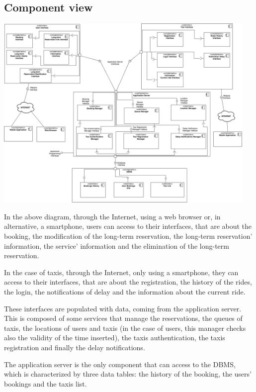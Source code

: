 \subsection{Component view}
	\begin{center}
		\includegraphics[width=0.95\textwidth]{./images/component_view.png}
	\end{center}
	
	In the above diagram, through the Internet, using a web browser or, in alternative, a smartphone, users can access to their interfaces, that are about the booking, the modification of the long-term reservation, the long-term reservation' information, the service' information and the elimination of the long-term reservation. 
	
	In the case of taxis, through the Internet, only using a smartphone, they can access to their interfaces, that are about the registration, the history of the rides, the login, the notifications of delay and the information about the current ride.
	
	These interfaces are populated with data, coming from the application server. This is composed of some services that manage the reservations, the queues of taxis, the locations of users and taxis (in the case of users, this manager checks also the validity of the time inserted), the taxis authentication, the taxis registration and finally the delay notifications.
	
	The application server is the only component that can access to the DBMS, which is characterized by three data tables: the history of the booking, the users' bookings and the taxis list.
